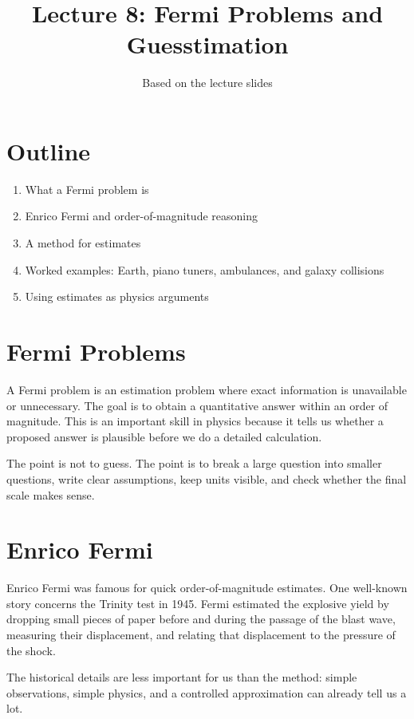 \documentclass[12pt]{article}
\title{\textbf{Lecture 8: Fermi Problems and Guesstimation}}
\author{Based on the lecture slides}
\date{}
\begin{document}
\maketitle

\section*{Outline}
\begin{enumerate}
    \item What a Fermi problem is
    \item Enrico Fermi and order-of-magnitude reasoning
    \item A method for estimates
    \item Worked examples: Earth, piano tuners, ambulances, and galaxy collisions
    \item Using estimates as physics arguments
\end{enumerate}

\section{Fermi Problems}
A Fermi problem is an estimation problem where exact information is unavailable or unnecessary. The goal is to obtain a quantitative answer within an order of magnitude. This is an important skill in physics because it tells us whether a proposed answer is plausible before we do a detailed calculation.

\begin{tcolorbox}[colback=blue!5!white]
The point is not to guess. The point is to break a large question into smaller questions, write clear assumptions, keep units visible, and check whether the final scale makes sense.
\end{tcolorbox}

\section{Enrico Fermi}
Enrico Fermi was famous for quick order-of-magnitude estimates. One well-known story concerns the Trinity test in 1945. Fermi estimated the explosive yield by dropping small pieces of paper before and during the passage of the blast wave, measuring their displacement, and relating that displacement to the pressure of the shock.

The historical details are less important for us than the method: simple observations, simple physics, and a controlled approximation can already tell us a lot.
\end{document}
